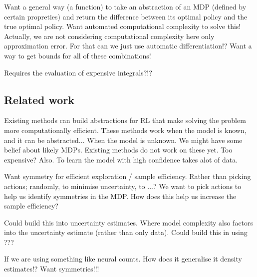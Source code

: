 Want a general way (a function) to take an abstraction of an MDP
(defined by certain propreties) and return the difference between its
optimal policy and the true optimal policy. Want automated computational
complexity to solve this! Actually, we are not considering computational
complexity here only approximation error. For that can we just use
automatic differentiation!? Want a way to get bounds for all of these
combinations!

Requires the evaluation of expensive integrals?!?

\subsection{Related work}

Existing methods can build abstractions for RL that make solving the problem more computationally efficient.
These methods work when the model is known, and it can be abstracted...
When the model is unknown. We might have some belief about likely MDPs. Existing methods do not work on these yet. Too expensive?
Also. To learn the model with high confidence takes alot of data.

Want symmetry for efficient exploration / sample efficiency.
Rather than picking actions; randomly, to minimise uncertainty, to ...?
We want to pick actions to help us identify symmetries in the MDP.
How does this help us increase the sample efficiency?

Could build this into uncertainty estimates. Where model complexity also factors into the uncertainty estimate (rather than only data).
Could build this in using ???

If we are using something like neural counts. How does it generalise it density estimates!?
Want symmetries!!!
